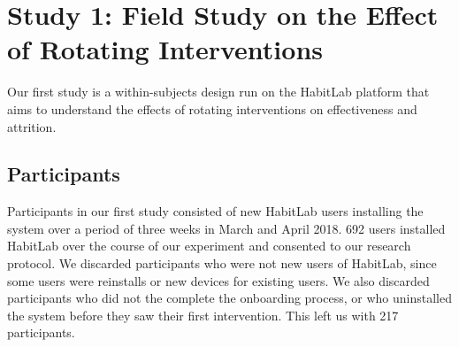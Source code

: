 \section{Study 1: Field Study on the Effect of Rotating Interventions}

Our first study is a within-subjects design run on the HabitLab platform that aims to understand the effects of rotating interventions on effectiveness and attrition.

\subsection{Participants}



Participants in our first study consisted of new HabitLab users installing the system over a period of three weeks in March and April 2018. 692 users installed HabitLab over the course of our experiment and consented to our research protocol. We discarded participants who were not new users of HabitLab, since some users were reinstalls or new devices for existing users. We also discarded participants who did not the complete the onboarding process, or who uninstalled the system before they saw their first intervention. This left us with 217 participants. %


